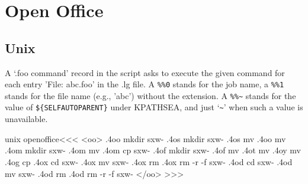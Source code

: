 \documentclass{article}
\begin{document}
\section{Open Office}



\subsection{Unix}


A `.foo command' record in the script asks to execute the given 
command for each entry 'File: abc.foo' in the .lg file.  A \verb=%%0=
stands for the job name, a \verb=%%1= stands for the file name
(e.g., 'abc') without  the extension. A \verb=%%~= stands for the
value  of \verb=${SELFAUTOPARENT}= under KPATHSEA, and just `\verb=~='
when such a value is unavailable.


\<unix openoffice\><<<
<oo>
.4oo mkdir sxw-%
.4os mkdir sxw-%
.4os mv    %
.4oo mv    %
.4om mkdir sxw-%
.4om mv    %
.4om cp    sxw-%
.4of mkdir sxw-%
.4of mv    %
.4ot mv    %
.4oy mv    %
.4og cp    %
.4ox cd sxw-%
.4ox mv    sxw-%
.4ox rm    %
.4ox rm -r -f sxw-%
.4od cd sxw-%
.4od mv    sxw-%
.4od rm    %
.4od rm -r -f sxw-%
</oo>
>>>
\end{document}
